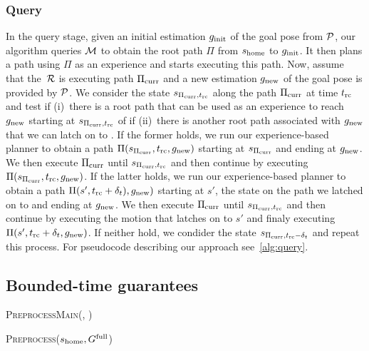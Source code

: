 \documentclass[conference]{IEEEtran}
\begin{document}
\subsubsection{Query}
In the query stage, given an initial estimation $g_{\rm init}$ of the goal pose from $\mathcal{P}$, our algorithm queries $\mathcal{M}$ to obtain the root path $\Pi$ from $s_{\textrm{home}}$ to $g_{\rm init}$.
It then plans a path using $\Pi$ as an experience and starts executing this path.
%
Now, assume that the~$\mathcal{R}$ is executing path $\Pi_{\rm curr}$ and a new estimation $g_{\rm new}$ of the goal pose is provided by $\mathcal{P}$.
%
We consider the state $s_{\Pi_{\rm curr}, t_{\textrm{rc}}}$ along the path $\Pi_{\rm curr}$ at time $t_{\textrm{rc}}$ and test if
(i)~there is a root path that can be used as an experience to reach $g_{\rm new}$ starting at $s_{\Pi_{\rm curr}, t_{\textrm{rc}}}$
of if 
(ii)~there is another root path associated with $g_{\rm new}$ that we can latch on to .
If the former holds, we run our experience-based planner to obtain a path $\Pi(s_{\Pi_{\rm curr}}, t_{\textrm{rc}}, g_{\rm new})$ starting at $s_{\Pi_{\rm curr}}$ and ending at $g_{\rm new}$. We then execute $\Pi_{\rm curr}$ until $s_{\Pi_{\rm curr}, t_{\textrm{rc}}}$ and then continue by executing $\Pi(s_{\Pi_{\rm curr}}, t_{\textrm{rc}}, g_{\rm new})$.
%
If the latter holds, we run our experience-based planner to obtain a path $\Pi(s', t_{\textrm{rc}} + \delta_t), g_{\rm new})$ starting at $s'$, the state on the path we latched on to and ending at $g_{\rm new}$. We then execute $\Pi_{\rm curr}$ until $s_{\Pi_{\rm curr}, t_{\textrm{rc}}}$ and then continue by executing the motion that latches on to $s'$ and finaly executing  $\Pi(s', t_{\textrm{rc}} + \delta_t, g_{\rm new})$.
%
If neither hold, we condider the state $s_{\Pi_{\rm curr}, t_{\textrm{rc}}-\delta_t}$ and repeat this process.
%
For pseudocode describing our approach see~\ref{alg:query}.

\subsection{Bounded-time guarantees}
\begin{algorithm}
\caption{\textsc{PreprocessMain(\Shome, \Gfull)}}\label{alg:all}
\begin{algorithmic}[1]
\State \textsc{Preprocess}($s_{\textrm{home}}, G^{\textrm{full}}$)
\end{algorithmic}
\end{algorithm}
\end{document}
